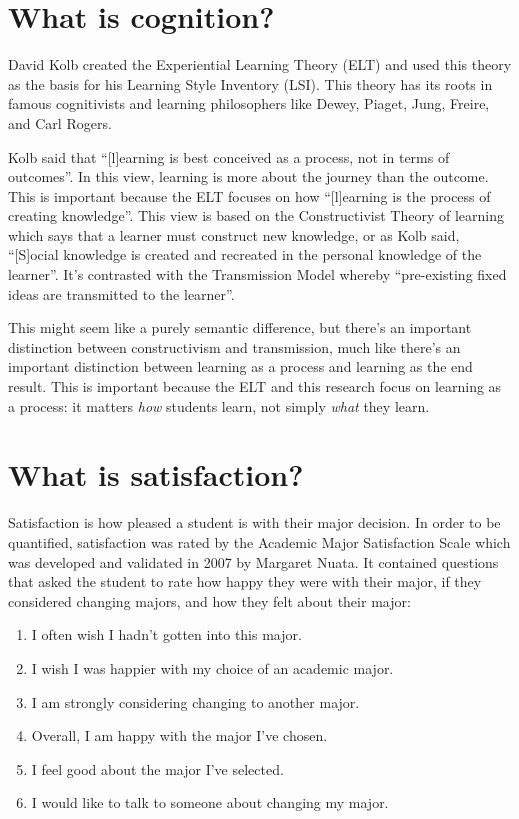 \section{What is cognition?}
David Kolb created the Experiential Learning Theory (ELT)\citep{kolb2005a} and used this theory as the basis for his Learning Style Inventory (LSI). This theory has its roots in famous cognitivists and learning philosophers like Dewey, Piaget, Jung, Freire, and Carl Rogers.

Kolb said that ``[l]earning is best conceived as a process, not in terms of outcomes''\citep{kolb2005a}. In this view, learning is more about the journey than the outcome. This is important because the ELT focuses on how ``[l]earning is the process of creating knowledge''\citep{kolb2005a}. This view is based on the Constructivist Theory of learning which says that a learner must construct new knowledge, or as Kolb said, ``[S]ocial knowledge is created and recreated in the personal knowledge of the learner''\citep{kolb2005b}. It's contrasted with the Transmission Model whereby ``pre-existing fixed ideas are transmitted to the learner''\citep{kolb2005a}.

This might seem like a purely semantic difference, but there's an important distinction between constructivism and transmission, much like there's an important distinction between learning as a process and learning as the end result. This is important because the ELT and this research focus on learning as a process: it matters \textit{how} students learn, not simply \textit{what} they learn.

\section{What is satisfaction?}
Satisfaction is how pleased a student is with their major decision. In order to be quantified, satisfaction was rated by the Academic Major Satisfaction Scale which was developed and validated in 2007 by Margaret Nuata. It contained questions that asked the student to rate how happy they were with their major, if they considered changing majors, and how they felt about their major:
\begin{enumerate}
  \item I often wish I hadn't gotten into this major.
  \item I wish I was happier with my choice of an academic major.
  \item I am strongly considering changing to another major.
  \item Overall, I am happy with the major I've chosen.
  \item I feel good about the major I've selected.
  \item I would like to talk to someone about changing my major.
\end{enumerate}

